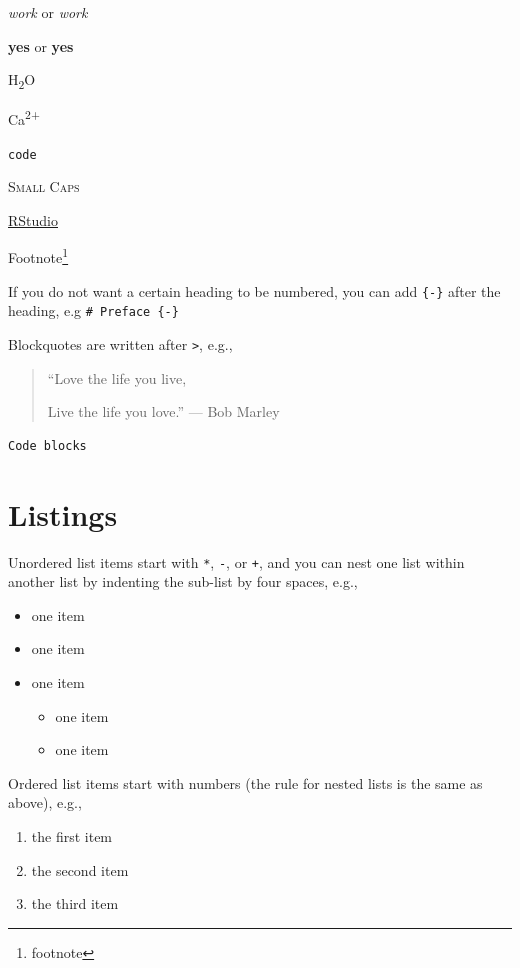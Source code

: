 \documentclass[
]{book}
\providecommand{\tightlist}{%
  \setlength{\itemsep}{0pt}\setlength{\parskip}{0pt}}
\theoremstyle{definition}
\theoremstyle{definition}
\theoremstyle{definition}
\theoremstyle{definition}
\theoremstyle{remark}
\begin{document}
\emph{work} or \emph{work}

\textbf{yes} or \textbf{yes}

H\textsubscript{2}O

Ca\textsuperscript{2+}

\texttt{code}

\textsc{Small Caps}

\href{https://www.rstudio.com}{RStudio}

Footnote\footnote{footnote}

If you do not want a certain heading to be numbered, you can add \texttt{\{-\}} after the heading, e.g \texttt{\#\ Preface\ \{-\}}

Blockquotes are written after \texttt{\textgreater{}}, e.g.,

\begin{quote}
``Love the life you live,

Live the life you love.''
--- Bob Marley
\end{quote}

\begin{verbatim}
Code blocks
\end{verbatim}

\hypertarget{listings}{%
\section{Listings}\label{listings}}

Unordered list items start with \texttt{*}, \texttt{-}, or \texttt{+}, and you can nest one list within another list by indenting the sub-list by four spaces, e.g.,

\begin{itemize}
\tightlist
\item
  one item
\item
  one item
\item
  one item

  \begin{itemize}
  \tightlist
  \item
    one item
  \item
    one item
  \end{itemize}
\end{itemize}

Ordered list items start with numbers (the rule for nested lists is the same as above), e.g.,

\begin{enumerate}
\def\labelenumi{\arabic{enumi}.}
\tightlist
\item
  the first item
\item
  the second item
\item
  the third item
\end{enumerate}
\end{document}
